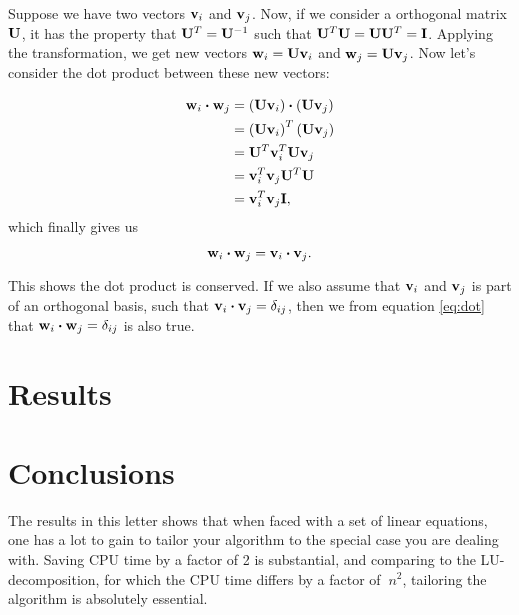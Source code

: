\documentclass{emulateapj}
\begin{document}
Suppose we have two vectors $\bold{v}_i$ and $\bold{v}_j$. Now, if we consider a orthogonal matrix $\bold{U}$, it has the property that $\bold{U}^T = \bold{U}^{-1}$ such that $\bold{U}^T\bold{U} = \bold{U}\bold{U}^T = \bold{I}$. Applying the transformation, we get new vectors $\bold{w}_i = \bold{U}\bold{v}_i$ and $ \bold{w}_j = \bold{U}\bold{v}_j$.
Now let's consider the dot product between these new vectors:

\begin{align*}
	\bold{w}_i \boldsymbol{\cdot} \bold{w}_j &= \left(\bold{U}\bold{v}_i\right) \boldsymbol{\cdot} \left(\bold{U}\bold{v}_j\right) \\
	&= \left(\bold{U}\bold{v}_i\right)^T \left(\bold{U}\bold{v}_j\right) \\
	&= \bold{U}^T \bold{v}_i^T \bold{U}\bold{v}_j \\
	&= \bold{v}_i^T  \bold{v}_j \bold{U}^T \bold{U} \\
	&= \bold{v}_i^T  \bold{v}_j \bold{I},
\end{align*}
which finally gives us

\begin{equation} \label{eq:dot}
	\bold{w}_i \boldsymbol{\cdot} \bold{w}_j = \bold{v}_i \boldsymbol{\cdot} \bold{v}_j.
\end{equation}


This shows the dot product is conserved. If we also assume that $\bold{v}_i$ and $\bold{v}_j$ is part of an orthogonal basis, such that $\bold{v}_i \boldsymbol{\cdot} \bold{v}_j = \delta_{ij}$, then we from equation \ref{eq:dot} that $\bold{w}_i \boldsymbol{\cdot} \bold{w}_j = \delta_{ij}$ is also true.


\section{Results}
\label{sec:results}





\section{Conclusions}
\label{sec:conclusions}
The results in this letter shows that when faced with a set of linear equations, one has a lot to gain to tailor your algorithm to the special case you are dealing with. Saving CPU time by a factor of 2 is substantial, and comparing to the LU-decomposition, for which the CPU time differs by a factor of $~n^2$, tailoring the algorithm is absolutely essential.
\end{document}
